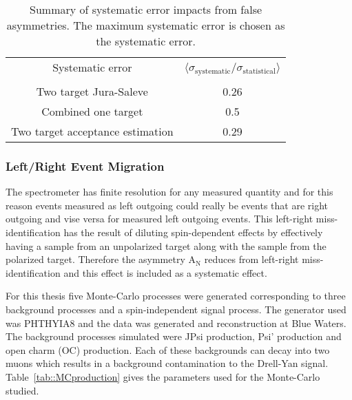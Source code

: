 \begin{table}[h!t]
  \centering
  \begin{tabular}{|c|c|}
    \hline Systematic error& \multirow{2}{9em}{$\langle
      \sigma_{\mathrm{systematic}}/\sigma_{\mathrm{statistical}}
      \rangle$}\\ & \\ \hline
    
    Two target Jura-Saleve& 0.26\\ \hline

    Combined one target& 0.5\\ \hline

    Two target acceptance estimation& 0.29\\ \hline
    
  \end{tabular}
  \caption{Summary of systematic error impacts from false asymmetries.  The
    maximum systematic error is chosen as the systematic error.}
  \label{tab::faSys}
\end{table}


\subsubsection{Left/Right Event Migration}
The spectrometer has finite resolution for any measured quantity and for this
reason events measured as left outgoing could really be events that are right
outgoing and vise versa for measured left outgoing events.  This left-right
miss-identification has the result of diluting spin-dependent effects by
effectively having a sample from an unpolarized target along with the sample
from the polarized target.  Therefore the asymmetry A$_{\mathrm{N}}$ reduces
from left-right miss-identification and this effect is included as a systematic
effect. \par

For this thesis five Monte-Carlo processes were generated corresponding to three
background processes and a spin-independent signal process.  The generator used
was PHTHYIA8 and the data was generated and reconstruction at Blue Waters.  The
background processes simulated were JPsi production, Psi' production and open
charm (OC) production.  Each of these backgrounds can decay into two muons which
results in a background contamination to the Drell-Yan signal.
Table~\ref{tab::MCproduction} gives the parameters used for the Monte-Carlo
studied.

